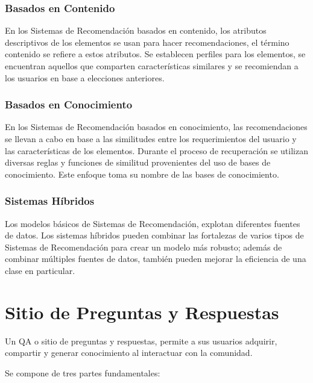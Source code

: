 \subsubsection{Basados en Contenido}

En los Sistemas de Recomendación basados en contenido,
los atributos descriptivos de los elementos se usan para hacer recomendaciones,
el término contenido se refiere a estos atributos.
Se establecen perfiles para los elementos,
se encuentran aquellos que comparten características similares y
se recomiendan a los usuarios en base a elecciones anteriores.

\subsubsection{Basados en Conocimiento}

En los Sistemas de Recomendación basados en conocimiento,
las recomendaciones se llevan a cabo en base a las similitudes
entre los requerimientos del usuario y las características de los elementos.
Durante el proceso de recuperación se utilizan diversas reglas y
funciones de similitud provenientes del uso de bases de conocimiento.
Este enfoque toma su nombre de las bases de conocimiento.

\subsubsection{Sistemas Híbridos}

Los modelos básicos de Sistemas de Recomendación, explotan diferentes fuentes de datos.
Los sistemas híbridos pueden combinar las fortalezas de varios tipos
de Sistemas de Recomendación para crear un modelo más robusto;
además de combinar múltiples fuentes de datos,
también pueden mejorar la eficiencia de una clase en particular.

\section{Sitio de Preguntas y Respuestas}
\label{sec:qa}

Un \ac{QA} o sitio de preguntas y respuestas,
permite a sus usuarios adquirir, compartir y generar
conocimiento al interactuar con la comunidad.

Se compone de tres partes fundamentales:

